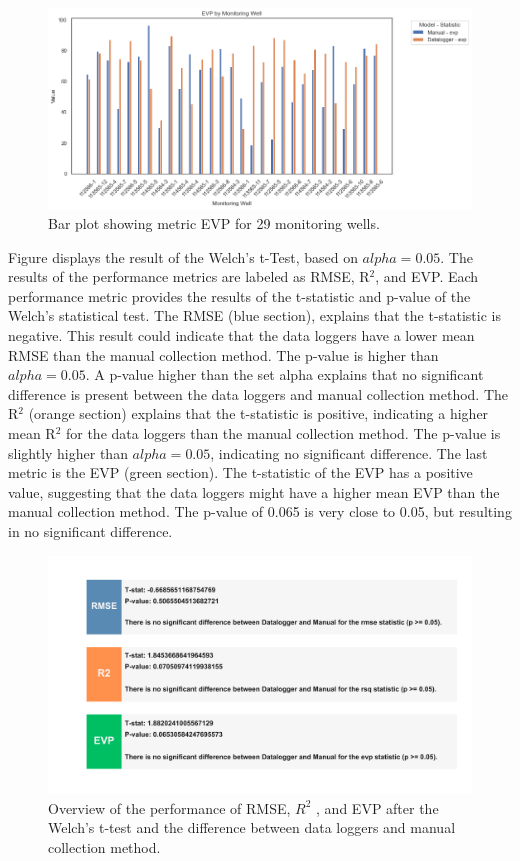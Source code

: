 \begin{figure}[h]
    \centering
    \begin{minipage}{0.48\textwidth}
        \centering
        \includegraphics[width=\linewidth]{frontmatter/Rozenburg-fig/evproz2.png} %
        \caption{Bar plot showing metric EVP for 29 monitoring wells.}
        \label{barevp}
    \end{minipage}\hfill
\end{figure}
\clearpage
\noindent
Figure  displays the result of the Welch's t-Test, based on \(alpha = 0.05.\) The results of the performance metrics are labeled as RMSE, R$^2$, and EVP. Each performance metric provides the results of the t-statistic and p-value of the Welch's statistical test. The RMSE (blue section), explains that the t-statistic is negative. This result could indicate that the data loggers have a lower mean RMSE than the manual collection method. The p-value is higher than \(alpha = 0.05\). A p-value higher than the set alpha explains that no significant difference is present between the data loggers and manual collection method. The R$^2$ (orange section) explains that the t-statistic is positive, indicating a higher mean R$^2$ for the data loggers than the manual collection method. The p-value is slightly higher than \(alpha = 0.05\), indicating no significant difference. The last metric is the EVP (green section). The t-statistic of the EVP has a positive value, suggesting that the data loggers might have a higher mean EVP than the manual collection method. The p-value of 0.065 is very close to 0.05, but resulting in no significant difference. 
\begin{figure}[htbp]
    \centering
    \includegraphics[width=0.80\linewidth]{frontmatter/Rozenburg-fig/sigroz.png}
    \caption{Overview of the performance of RMSE, $R^2$ , and EVP after the Welch's t-test and the difference between data loggers and manual collection method. }
    \label{welch}
\end{figure}\\
